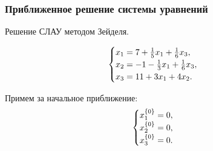\documentclass[10pt, a4paper, titlepage]{article}
\begin{document}
\subsubsection*{Приближенное решение системы уравнений}

Решение СЛАУ методом Зейделя.

\begin{equation*}
    \begin{cases}
        $$x_1=7+\frac{1}{5}x_1+\frac{1}{6}x_3$$, \\
        $$x_2=-1-\frac{1}{3}x_1+\frac{1}{6}x_3$$, \\
        $$x_3=11+3x_1+4x_2$$.
    \end{cases}
\end{equation*}

Примем за начальное приближение:
\begin{equation*}
    \begin{cases}
        $$x_1^{\{0\}}=0$$, \\
        $$x_2^{\{0\}}=0$$, \\
        $$x_3^{\{0\}}=0$$.
    \end{cases}
\end{equation*}
\end{document}
